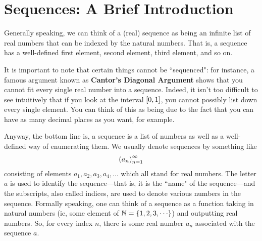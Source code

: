 \section{Sequences: A Brief Introduction}

Generally speaking, we can think of a (real) sequence as being an infinite list of real numbers that can be indexed by the natural numbers. That is, a sequence has a well-defined first element, second element, third element, and so on.

It is important to note that certain things cannot be ``sequenced": for instance, a famous argument known as \textbf{Cantor's Diagonal Argument} shows that you cannot fit every single real number into a sequence. Indeed, it isn't too difficult to see intuitively that if you look at the interval $\left[ 0,1 \right]$, you cannot possibly list down every single element. You can think of this as being due to the fact that you can have as many decimal places as you want, for example.

Anyway, the bottom line is, a sequence is a list of numbers as well as a well-defined way of enumerating them. We usually denote sequences by something like
\begin{align*}
    \left( a_n \right)_{n=1}^{\infty}
\end{align*}
consisting of elements $a_1, a_2, a_3, a_4, \ldots$ which all stand for real numbers. The letter $a$ is used to identify the sequence---that is, it is the ``name" of the sequence---and the subscripts, also called indices, are used to denote various numbers in the sequence. Formally speaking, one can think of a sequence as a function taking in natural numbers (ie, some element of $\N = \set{1, 2, 3, \cdots}$) and outputting real numbers. So, for every index $n$, there is some real number $a_n$ associated with the sequence $a$.


